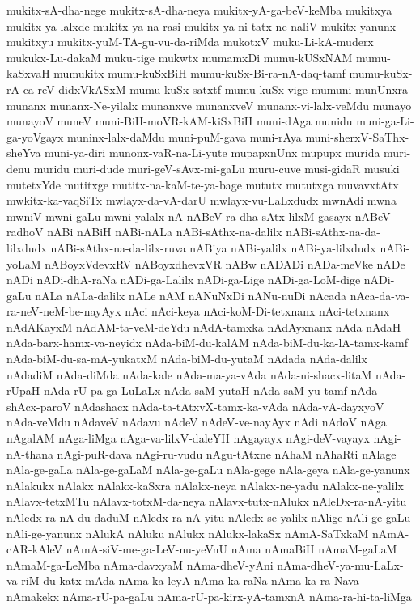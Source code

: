 {mukitx-sA-dha-nege
mukitx-sA-dha-neya
mukitx-yA-ga-beV-keMba
mukitxya
mukitx-ya-lalxde
mukitx-ya-na-rasi
mukitx-ya-ni-tatx-ne-naliV
mukitx-yanunx
mukitxyu
mukitx-yuM-TA-gu-vu-da-riMda
mukotxV
muku-Li-kA-muderx
mukukx-Lu-dakaM
muku-tige
mukwtx
mumamxDi
mumu-kUSxNAM
mumu-kaSxvaH
mumukitx
mumu-kuSxBiH
mumu-kuSx-Bi-ra-nA-daq-tamf
mumu-kuSx-rA-ca-reV-didxVkASxM
mumu-kuSx-satxtf
mumu-kuSx-vige
mumuni
munUnxra
munanx
munanx-Ne-yilalx
munanxve
munanxveV
munanx-vi-lalx-veMdu
munayo
munayoV
muneV
muni-BiH-moVR-kAM-kiSxBiH
muni-dAga
munidu
muni-ga-Li-ga-yoVgayx
muninx-lalx-daMdu
muni-puM-gava
muni-rAya
muni-sherxV-SaThx-sheYva
muni-ya-diri
munonx-vaR-na-Li-yute
mupapxnUnx
mupupx
murida
muri-denu
muridu
muri-dude
muri-geV-sAvx-mi-gaLu
muru-cuve
musi-gidaR
musuki
mutetxYde
mutitxge
mutitx-na-kaM-te-ya-bage
mututx
mututxga
muvavxtAtx
mwkitx-ka-vaqSiTx
mwlayx-da-vA-darU
mwlayx-vu-LaLxdudx
mwnAdi
mwna
mwniV
mwni-gaLu
mwni-yalalx
nA
nABeV-ra-dha-sAtx-lilxM-gasayx
nABeV-radhoV
nABi
nABiH
nABi-nALa
nABi-sAthx-na-dalilx
nABi-sAthx-na-da-lilxdudx
nABi-sAthx-na-da-lilx-ruva
nABiya
nABi-yalilx
nABi-ya-lilxdudx
nABi-yoLaM
nABoyxVdevxRV
nABoyxdhevxVR
nABw
nADADi
nADa-meVke
nADe
nADi
nADi-dhA-raNa
nADi-ga-Lalilx
nADi-ga-Lige
nADi-ga-LoM-dige
nADi-gaLu
nALa
nALa-dalilx
nALe
nAM
nANuNxDi
nANu-nuDi
nAcada
nAca-da-va-ra-neV-neM-be-nayAyx
nAci
nAci-keya
nAci-koM-Di-tetxnanx
nAci-tetxnanx
nAdAKayxM
nAdAM-ta-veM-deYdu
nAdA-tamxka
nAdAyxnanx
nAda
nAdaH
nAda-barx-hamx-va-neyidx
nAda-biM-du-kalAM
nAda-biM-du-ka-lA-tamx-kamf
nAda-biM-du-sa-mA-yukatxM
nAda-biM-du-yutaM
nAdada
nAda-dalilx
nAdadiM
nAda-diMda
nAda-kale
nAda-ma-ya-vAda
nAda-ni-shacx-litaM
nAda-rUpaH
nAda-rU-pa-ga-LuLaLx
nAda-saM-yutaH
nAda-saM-yu-tamf
nAda-shAcx-paroV
nAdashacx
nAda-ta-tAtxvX-tamx-ka-vAda
nAda-vA-dayxyoV
nAda-veMdu
nAdaveV
nAdavu
nAdeV
nAdeV-ve-nayAyx
nAdi
nAdoV
nAga
nAgalAM
nAga-liMga
nAga-va-lilxV-daleYH
nAgayayx
nAgi-deV-vayayx
nAgi-nA-thana
nAgi-puR-dava
nAgi-ru-vudu
nAgu-tAtxne
nAhaM
nAhaRti
nAlage
nAla-ge-gaLa
nAla-ge-gaLaM
nAla-ge-gaLu
nAla-gege
nAla-geya
nAla-ge-yanunx
nAlakukx
nAlakx
nAlakx-kaSxra
nAlakx-neya
nAlakx-ne-yadu
nAlakx-ne-yalilx
nAlavx-tetxMTu
nAlavx-totxM-da-neya
nAlavx-tutx-nAlukx
nAleDx-ra-nA-yitu
nAledx-ra-nA-du-daduM
nAledx-ra-nA-yitu
nAledx-se-yalilx
nAlige
nAli-ge-gaLu
nAli-ge-yanunx
nAlukA
nAluku
nAlukx
nAlukx-lakaSx
nAmA-SaTxkaM
nAmA-cAR-kAleV
nAmA-siV-me-ga-LeV-nu-yeVnU
nAma
nAmaBiH
nAmaM-gaLaM
nAmaM-ga-LeMba
nAma-davxyaM
nAma-dheV-yAni
nAma-dheV-ya-mu-LaLx-va-riM-du-katx-mAda
nAma-ka-leyA
nAma-ka-raNa
nAma-ka-ra-Nava
nAmakekx
nAma-rU-pa-gaLu
nAma-rU-pa-kirx-yA-tamxnA
nAma-ra-hi-ta-liMga
}
